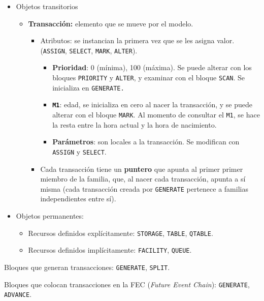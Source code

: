 \documentclass[12pt, a4paper, twoside]{paquetes-apunte/apunte}
\begin{document}
\begin{itemize}
  \item Objetos transitorios
  \begin{itemize}
    \item \textbf{Transacción:} elemento que se mueve por el modelo.
    \begin{itemize}
      \item Atributos: se instancian la primera vez que se les asigna valor.
        (\texttt{ASSIGN}, \texttt{SELECT}, \texttt{MARK}, \texttt{ALTER}).
      \begin{itemize}
        \item \textbf{Prioridad}: 0 (mínima), 100 (máxima). Se puede alterar con
          los bloques \texttt{PRIORITY} y \texttt{ALTER}, y examinar con el
          bloque \texttt{SCAN}. Se inicializa en \texttt{GENERATE.}
        \item \texttt{\textbf{M1}}: edad, se inicializa en cero al nacer la transacción,
          y se puede alterar con el bloque \texttt{MARK}. Al momento de consultar
          el \texttt{M1}, se hace la resta entre la hora actual y la hora de
          nacimiento.
        \item \textbf{Parámetros}: son locales a la transacción. Se modifican con
          \texttt{ASSIGN} y \texttt{SELECT}.
      \end{itemize}

      \item Cada transacción tiene un \textbf{puntero} que apunta al primer primer
        miembro de la familia, que, al nacer cada transacción, apunta a sí
        misma (cada transacción creada por \texttt{GENERATE} pertenece a familias
        independientes entre sí).
    \end{itemize}
  \end{itemize}

  \item Objetos permanentes:
  \begin{itemize}
    \item Recursos definidos explícitamente: \texttt{STORAGE}, \texttt{TABLE},
      \texttt{QTABLE}.
    \item Recursos definidos implícitamente: \texttt{FACILITY}, \texttt{QUEUE}.
  \end{itemize}
\end{itemize}

Bloques que generan transacciones: \texttt{GENERATE}, \texttt{SPLIT}.

Bloques que colocan transacciones en la FEC (\emph{Future Event Chain}):
\texttt{GENERATE}, \texttt{ADVANCE}.
\end{document}
